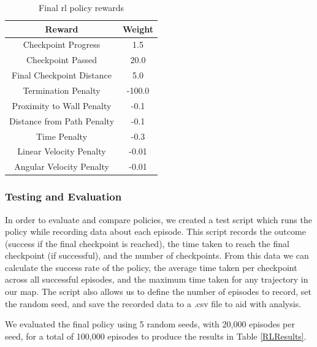 \documentclass{report_template_oxford}
\begin{document}
\begin{table}[htbp] 
    \centering
    \caption{Final \gls{rl} policy rewards}
    \label{RLRewards}
    \begin{tabular}{|c|c|}
        \hline
        \textbf{Reward} & \textbf{Weight}\\
        \hline 
        Checkpoint Progress & 1.5 \\
        \hline
        Checkpoint Passed & 20.0 \\
        \hline
        Final Checkpoint Distance & 5.0 \\
        \hline
        Termination Penalty & -100.0 \\
        \hline
        Proximity to Wall Penalty & -0.1 \\
        \hline
        Distance from Path Penalty & -0.1 \\
        \hline
        Time Penalty & -0.3 \\
        \hline
        Linear Velocity Penalty & -0.01 \\
        \hline
        Angular Velocity Penalty & -0.01 \\
        \hline
    \end{tabular}
\end{table}

\subsubsection{Testing and Evaluation}
In order to evaluate and compare policies, we created a test script which runs the policy while recording data about each episode. This script records the outcome (success if the final checkpoint is reached), the time taken to reach the final checkpoint (if successful), and the number of checkpoints. From this data we can calculate the success rate of the policy, the average time taken per checkpoint across all successful episodes, and the maximum time taken for any trajectory in our map. The script also allows us to define the number of episodes to record, set the random seed, and save the recorded data to a .csv file to aid with analysis.

We evaluated the final policy using 5 random seeds, with 20,000 episodes per seed, for a total of 100,000 episodes to produce the results in Table \ref{RLResults}.
\end{document}
